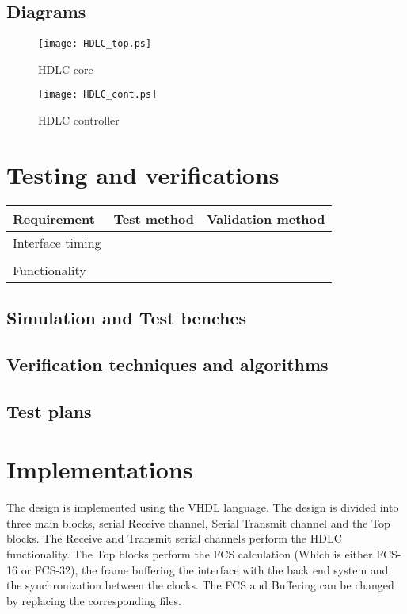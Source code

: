 \documentclass[a4paper,11pt]{article}
\begin{document}
 
\subsection{Diagrams}
\begin{figure}[!h]
\texttt{[image: HDLC\_top.ps]}
\caption{HDLC core}\label{Core}
\end{figure}
 
\begin{figure}[!h]
\texttt{[image: HDLC\_cont.ps]}
\caption{HDLC controller}\label{controller}
\end{figure}
 
 
\section{Testing and verifications}
 
 
\begin{tabular}{|l|l|l|}
\hline
Requirement & Test method & Validation method \\
\hline
\hline
Interface timing & &\\
\hline
& & \\
\hline
\hline
Functionality & & \\
\hline
\end{tabular}
\subsection{Simulation and Test benches}
 
\subsection{Verification techniques and algorithms}
 
\subsection{Test plans}
 
\section{Implementations}
The  design is implemented using the VHDL language. The design is divided into three main blocks, serial Receive channel, Serial Transmit channel and the Top blocks.
The Receive and Transmit serial channels perform the HDLC
functionality. The Top blocks perform the FCS calculation (Which is
either  FCS-16 or FCS-32), the frame buffering the interface with the
back end system and the synchronization between the clocks. The FCS and Buffering can be changed by replacing the corresponding files.
 
\end{document}
